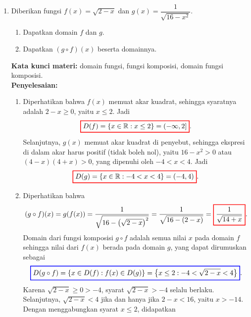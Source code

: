 \documentclass[10pt,openany,a4paper]{article}
\theoremstyle{definition}
\theoremstyle{definition}
\theoremstyle{plain}
\newenvironment{jawab}[2][tes]{%
\par\noindent\textbf{Kata kunci materi:} #1.\\
\textbf{Penyelesaian:} #2%
}{}
\begin{document}
\begin{enumerate}
    \item Diberikan fungsi $f(x)=\sqrt{2-x}$ dan $g(x)=\dfrac{1}{\sqrt{16-x^2}}$.
    \begin{enumerate}
        \item Dapatkan domain $f$ dan $g$.
        \item Dapatkan $(g\circ f)(x)$ beserta domainnya.
    \end{enumerate}
    \begin{jawab}[domain fungsi, fungsi komposisi, domain fungsi komposisi]{
        \begin{enumerate}
            \item Diperhatikan bahwa $f(x)$ memuat akar kuadrat, sehingga syaratnya adalah $2-x\geq 0$, yaitu $x\leq 2$. Jadi
            \begin{align*}
                \colorlet{oldcolor}{.}
        \color{red}
        \setlength{\fboxrule}{1pt} \boxed{\color{oldcolor}D(f)=\{x\in\mathbb{R} : x\leq 2\}=(-\infty,2]}\color{oldcolor}.
            \end{align*}
            Selanjutnya, $g(x)$ memuat akar kuadrat di penyebut, sehingga ekspresi di dalam akar harus positif (tidak boleh nol), yaitu $16-x^2>0$ atau $(4-x)(4+x)>0$, yang dipenuhi oleh $-4<x<4$. Jadi
            \begin{align*}
                \colorlet{oldcolor}{.}
        \color{red}
        \setlength{\fboxrule}{1pt} \boxed{\color{oldcolor}D(g)=\{x\in\mathbb{R} : -4<x<4\}=(-4,4)}\color{oldcolor}.
            \end{align*}
            \item Diperhatikan bahwa
            \begin{align*}
                (g\circ f)(x) = g(f(x)) = \frac{1}{\sqrt{16-\left(\sqrt{2-x}\right)^2}} = \frac{1}{\sqrt{16-(2-x)}} = \colorlet{oldcolor}{.}
        \color{red}
        \setlength{\fboxrule}{1pt} \boxed{\color{oldcolor}\frac{1}{\sqrt{14+x}}}\color{oldcolor}.
            \end{align*}
            Domain dari fungsi komposisi $g\circ f$ adalah semua nilai $x$ pada domain $f$ sehingga nilai dari $f(x)$ berada pada domain $g$, yang dapat dirumuskan sebagai
            \begin{align*}
                \colorlet{oldcolor}{.}
        \color{blue}
        \setlength{\fboxrule}{1pt} \boxed{\color{oldcolor}D(g\circ f) = \{x \in D(f) : f(x) \in D(g)\} = \left\{x \leq 2 : -4<\sqrt{2-x}<4\right\}}\color{oldcolor}.
            \end{align*}
            Karena $\sqrt{2-x}\geq 0>-4$, syarat $\sqrt{2-x}>-4$ selalu berlaku. Selanjutnya, $\sqrt{2-x}<4$ jika dan hanya jika $2-x<16$, yaitu $x>-14$. Dengan menggabungkan syarat $x\leq 2$, didapatkan

\end{enumerate}}
\end{jawab}
\end{enumerate}
\end{document}
